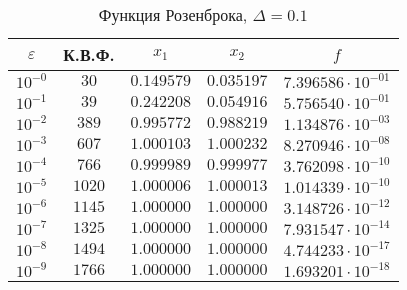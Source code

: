 \documentclass[a4paper,12pt,notitlepage,pdftex,headsepline]{scrartcl}
\begin{document}
        \begin{table}[ht]
          \centering
          \caption{Функция Розенброка, $\Delta = 0.1$}
          \begin{tabular}{|c|c|c|c|c|}
            \hline
            $\varepsilon$ & К.В.Ф. & $x_1$ & $x_2$ & $f$\\
            \hline
            $10^{-0}$ & $30$ & $0.149579$ & $0.035197$ & $7.396586\cdot 10^{-01}$\\
            $10^{-1}$ & $39$ & $0.242208$ & $0.054916$ & $5.756540\cdot 10^{-01}$\\
            $10^{-2}$ & $389$ & $0.995772$ & $0.988219$ & $1.134876\cdot 10^{-03}$\\
            $10^{-3}$ & $607$ & $1.000103$ & $1.000232$ & $8.270946\cdot 10^{-08}$\\
            $10^{-4}$ & $766$ & $0.999989$ & $0.999977$ & $3.762098\cdot 10^{-10}$\\
            $10^{-5}$ & $1020$ & $1.000006$ & $1.000013$ & $1.014339\cdot 10^{-10}$\\
            $10^{-6}$ & $1145$ & $1.000000$ & $1.000000$ & $3.148726\cdot 10^{-12}$\\
            $10^{-7}$ & $1325$ & $1.000000$ & $1.000000$ & $7.931547\cdot 10^{-14}$\\
            $10^{-8}$ & $1494$ & $1.000000$ & $1.000000$ & $4.744233\cdot 10^{-17}$\\
            $10^{-9}$ & $1766$ & $1.000000$ & $1.000000$ & $1.693201\cdot 10^{-18}$\\
            \hline
          \end{tabular}
        \end{table}
\end{document}
